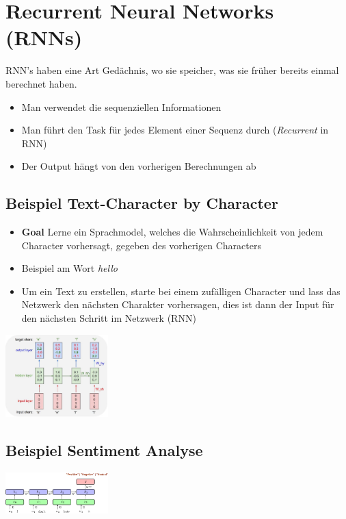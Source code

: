 \documentclass{article}
\newenvironment{Figure}
	{\par\medskip\noindent\minipage{\linewidth}}
	{\endminipage\par\medskip}
\theoremstyle{merke}
\theoremstyle{definition}
\begin{document}
    \section{Recurrent Neural Networks (RNNs)}
    RNN's haben eine Art Gedächnis, wo sie speicher, was sie früher bereits einmal berechnet haben. 
    \begin{itemize}
        \item Man verwendet die sequenziellen Informationen
        \item Man führt den Task für jedes Element einer Sequenz durch (\textit{Recurrent} in RNN)
        \item Der Output hängt von den vorherigen Berechnungen ab
    \end{itemize}

        \subsection{Beispiel Text-Character by Character}
        \begin{itemize}
            \item \textbf{Goal} Lerne ein Sprachmodel, welches die Wahrscheinlichkeit von jedem Character vorhersagt, gegeben des vorherigen Characters
            \item Beispiel am Wort \textit{hello}
            \item Um ein Text zu erstellen, starte bei einem zufälligen Character und lass das Netzwerk den nächsten Charakter vorhersagen, dies ist dann der Input für den nächsten Schritt im Netzwerk (RNN)
        \end{itemize}
        
        \begin{Figure}
        \centering
        \includegraphics[width=150px]{img/RNNHello.png}
            \label{fig:Beispiel eines RNN mit dem Wort Hello}
        \end{Figure}
    
        \subsection{Beispiel Sentiment Analyse}
        \begin{Figure}
        \centering
        \includegraphics[width=150px]{img/RNNSentiment.png}
            \label{fig:Beispiel eines RNN für die Sentiment Analyse}
        \end{Figure}
        
\end{document}
